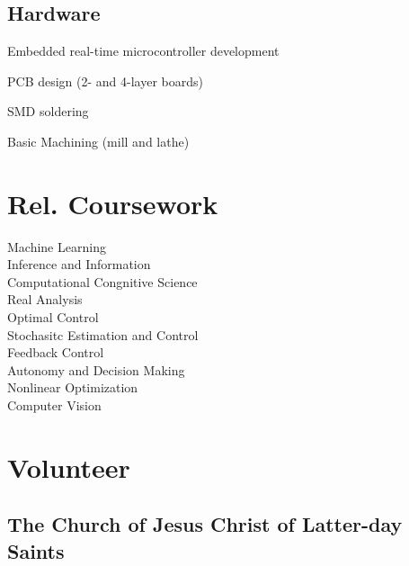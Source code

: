 \documentclass[letterpaper]{deedy-resume} %
\begin{document}
\begin{minipage}[t]{0.33\textwidth}
\sectionspace

\subsection{Hardware}

\vspace{\topsep} %
\begin{tightitemize}
\item Embedded real-time microcontroller development
\item PCB design (2- and 4-layer boards)
\item SMD soldering
\item Basic Machining (mill and lathe)
\end{tightitemize}


\sectionspace %
\sectionspace
\sectionspace

\section{Rel. Coursework}

Machine Learning \\
Inference and Information \\
Computational Congnitive Science \\
Real Analysis \\
Optimal Control \\
Stochasitc Estimation and Control \\
Feedback Control \\
Autonomy and Decision Making \\
Nonlinear Optimization \\
Computer Vision


\sectionspace %
\sectionspace
\sectionspace


\section{Volunteer}

\subsection{The Church of Jesus Christ of
  Latter-day Saints}


\end{minipage}
\end{document}
